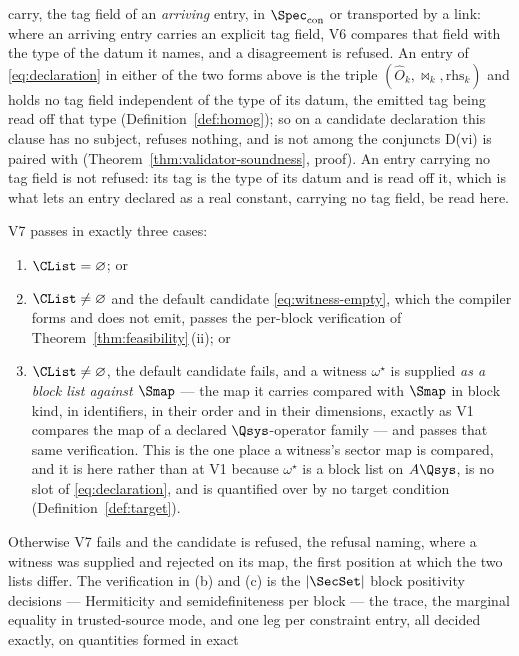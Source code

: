 \begin{definition}
\begin{description}[leftmargin=3.0em,style=nextline]
  carry, the tag field of an \emph{arriving} entry, in $\Spec_{\mathrm{con}}$
  or transported by a link: where an arriving entry carries an explicit tag
  field, V6 compares that field with the type of the datum it names, and a
  disagreement is refused. An entry of \eqref{eq:declaration} in
  either of the two forms above is the triple
  $(\hat O_k,\bowtie_k,\mathrm{rhs}_k)$ and holds no tag field independent of
  the type of its datum, the emitted tag being read off that type
  (Definition~\ref{def:homog}); so on a candidate declaration this clause has
  no subject, refuses nothing, and is not among the conjuncts D(vi) is paired
  with (Theorem~\ref{thm:validator-soundness}, proof). An entry carrying no tag field is not
  refused: its tag is the type of its datum and is read off it, which is what
  lets an entry declared as
  a real constant, carrying no tag field, be read here.
\item[V7 (feasibility; one-sided, three branches)] V7 passes in exactly three
  cases:
  \begin{enumerate}[label=(\alph*),leftmargin=2.2em]
  \item $\CList=\varnothing$; or
  \item $\CList\ne\varnothing$ and the default candidate
    \eqref{eq:witness-empty}, which the compiler forms and does not emit,
    passes the per-block verification of Theorem~\ref{thm:feasibility}\,(ii); or
  \item $\CList\ne\varnothing$, the default candidate fails, and a witness
    $\omega^{\star}$ is supplied \emph{as a block list against $\Smap$} --- the
    map it carries compared with $\Smap$ in block kind, in identifiers, in
    their order and in their dimensions, exactly as V1 compares the map of a
    declared $\Qsys$-operator family --- and passes that same verification.
    This is the one place a witness's sector map is compared, and it is
    here rather than at V1 because $\omega^{\star}$ is a block list on
    $A\Qsys$, is no slot of \eqref{eq:declaration}, and is quantified over by
    no target condition (Definition~\ref{def:target}).
  \end{enumerate}
  Otherwise V7 fails and the candidate is refused, the refusal naming, where a
  witness was supplied and rejected on its map, the first position at which
  the two lists differ. The verification in (b) and (c) is the $|\SecSet|$
  block positivity decisions --- Hermiticity and semidefiniteness per block
  --- the trace, the marginal equality in trusted-source mode, and one leg per
  constraint entry, all decided exactly, on quantities formed in exact

\end{description}
\end{definition}
